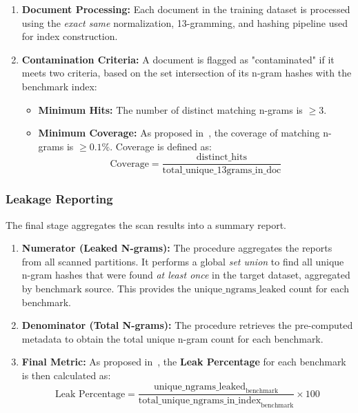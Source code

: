 \begin{enumerate}
    \item \textbf{Document Processing:} Each document in the training dataset is processed using the \textit{exact same} normalization, 13-gramming, and hashing pipeline used for index construction.
    
    \item \textbf{Contamination Criteria:} A document is flagged as "contaminated" if it meets two criteria, based on the set intersection of its n-gram hashes with the benchmark index:
    \begin{itemize}
        \item \textbf{Minimum Hits:} The number of distinct matching n-grams is $\geq 3$.
        \item \textbf{Minimum Coverage:} As proposed in~\cite{rae2022scalinglanguagemodelsmethods}, the coverage of matching n-grams is $\geq 0.1\%$. Coverage is defined as:
        $$
        \text{Coverage} = \frac{\text{distinct\_hits}}{\text{total\_unique\_13grams\_in\_doc}}
        $$
    \end{itemize}
\end{enumerate}

\subsubsection{Leakage Reporting}
The final stage aggregates the scan results into a summary report.

\begin{enumerate}
    \item \textbf{Numerator (Leaked N-grams):} The procedure aggregates the reports from all scanned partitions. It performs a global \textit{set union} to find all unique n-gram hashes that were found \textit{at least once} in the target dataset, aggregated by benchmark source. This provides the $\text{unique\_ngrams\_leaked}$ count for each benchmark.
    
    \item \textbf{Denominator (Total N-grams):} The procedure retrieves the pre-computed metadata to obtain the total unique n-gram count for each benchmark.
    
    \item \textbf{Final Metric:} As proposed in~\cite{touvron2023llamaopenefficientfoundation}, the \textbf{Leak Percentage} for each benchmark is then calculated as:
    $$
    \text{Leak Percentage} = \frac{\text{unique\_ngrams\_leaked}_{\text{benchmark}}}{\text{total\_unique\_ngrams\_in\_index}_{\text{benchmark}}} \times 100
    $$
\end{enumerate}

